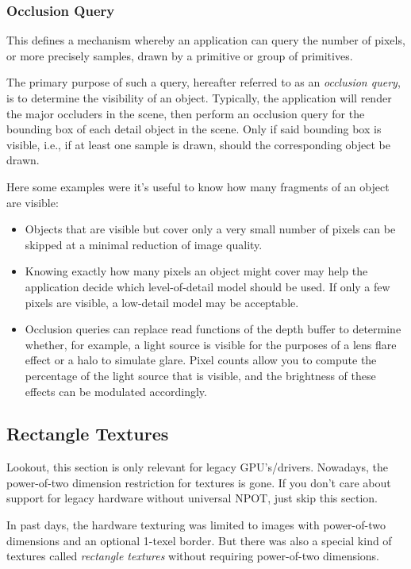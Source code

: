 \subsubsection{Occlusion Query}
This defines a mechanism whereby an application can query the number of pixels, or more precisely samples, drawn by a primitive or group of primitives.

The primary purpose of such a query, hereafter referred to as an \emph{occlusion query}, is to determine the visibility of an object. Typically, the application will render the major occluders in the scene, then perform an occlusion query for the bounding box of each detail object in the scene. Only if said bounding box is visible, i.e., if at least one sample is drawn, should the corresponding object be drawn.

Here some examples were it's useful to know how many fragments of an object are visible:
\begin{itemize}
\item{Objects that are visible but cover only a very small number of pixels can be skipped at a minimal reduction of image quality.}
\item{Knowing exactly how many pixels an object might cover may help the application decide which level-of-detail model should be used. If only a few pixels are visible, a low-detail model may be acceptable.}
\item{Occlusion queries can replace read functions of the depth buffer to determine whether, for example, a light source is visible for the purposes of a lens flare effect or a halo to simulate glare. Pixel counts allow you to compute the percentage of the light source that is visible, and the brightness of these effects can be modulated accordingly.}
\end{itemize}




\subsection{Rectangle Textures}
\hypertarget{Rectangle textures}{}
Lookout, this section is only relevant for legacy GPU's/drivers. Nowadays, the power-of-two dimension restriction for textures is gone. If you don't care about support for legacy hardware without universal NPOT, just skip this section.

In past days, the hardware texturing was limited to images with power-of-two dimensions and an optional 1-texel border. But there was also a special kind of textures called \emph{rectangle textures} without requiring power-of-two dimensions.

